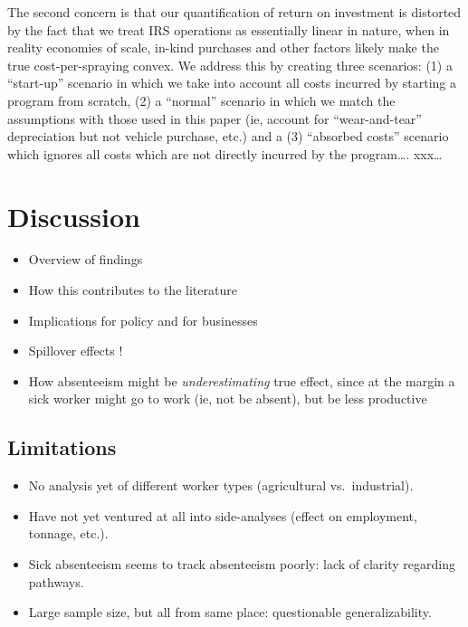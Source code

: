 \documentclass[]{article}
\providecommand{\tightlist}{%
  \setlength{\itemsep}{0pt}\setlength{\parskip}{0pt}}
\begin{document}
The second concern is that our quantification of return on investment is
distorted by the fact that we treat IRS operations as essentially linear
in nature, when in reality economies of scale, in-kind purchases and
other factors likely make the true cost-per-spraying convex. We address
this by creating three scenarios: (1) a ``start-up'' scenario in which
we take into account all costs incurred by starting a program from
scratch, (2) a ``normal'' scenario in which we match the assumptions
with those used in this paper (ie, account for ``wear-and-tear''
depreciation but not vehicle purchase, etc.) and a (3) ``absorbed
costs'' scenario which ignores all costs which are not directly incurred
by the program\ldots{}. xxx\ldots{}

\newpage

\section{Discussion}\label{discussion}


\begin{itemize}
\tightlist
\item
  Overview of findings
\item
  How this contributes to the literature
\item
  Implications for policy and for businesses
\item
  Spillover effects !
\item
  How absenteeism might be \emph{underestimating} true effect, since at
  the margin a sick worker might go to work (ie, not be absent), but be
  less productive
\end{itemize}

\subsection{Limitations}\label{limitations}

\begin{itemize}
\tightlist
\item
  No analysis yet of different worker types (agricultural
  vs.~industrial).
\item
  Have not yet ventured at all into side-analyses (effect on employment,
  tonnage, etc.).
\item
  Sick absenteeism seems to track absenteeism poorly: lack of clarity
  regarding pathways.
\item
  Large sample size, but all from same place: questionable
  generalizability.
\end{itemize}
\end{document}
